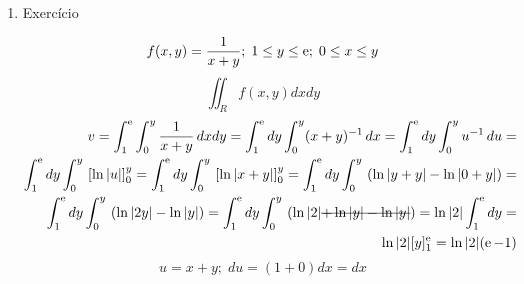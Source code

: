 \begin{enumerate}
	\item Exercício
	
	\begin{equation*}
		f(x,y) = \dfrac{1}{x + y};\; 1 \leq y \leq \operatorname{e};\; 0 \leq x \leq y	
	\end{equation*}
	\begin{equation*}
		\iint_R f(x, y) dx dy
	\end{equation*}
	\begin{align*}
		v = \int_1^{\e} \int_0^y \dfrac{1}{x + y}\, dx dy = \int_1^{\e} dy \int_0^y (x + y)^{-1}\, dx = \int_1^{\e} dy \int_0^y u^{-1}\, du =\\ \int_1^{\e} dy \int_0^y\, \left[\ln |u|\right]_0^y = \int_1^{\e} dy \int_0^y\, \left[\ln |x + y|\right]_0^y = \int_1^{\e} dy \int_0^y\, \left(\ln |y + y| - \ln |0 + y|\right) =\\ \int_1^{\e} dy \int_0^y\, \left(\ln |2y| - \ln |y|\right) = \int_1^{\e} dy \int_0^y\, \left(\ln |2| \overstrike{+ \ln |y| - \ln |y|}\right) = \ln |2|\int_1^{\e} dy =\\ \ln |2|[y]_1^{\e} = \ln |2|(\e - 1)
	\end{align*}
	\begin{equation*}
		u = x + y;\; du = (1 + 0)dx = dx
	\end{equation*}
\end{enumerate}